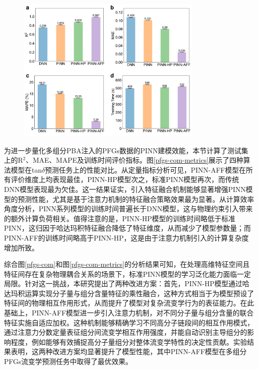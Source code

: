 \begin{figure}[htbp]
  \centering
  \includegraphics[width=0.8\textwidth]{Fig/pfgs-com-metrics.pdf}
\end{figure}
为进一步量化多组分PBA注入的PFGs数据的PINN建模效能，本节计算了测试集上的R$^2$、MAE、MAPE及训练时间评价指标。图\ref{pfgs-com-metrics}展示了四种算法模型在tan$\delta$预测任务上的性能对比。从定量指标分析可见，PINN-AFF模型在所有评价维度上均表现最佳，PINN-HP模型次之，标准PINN模型再次，而传统DNN模型表现最为欠佳。这一结果证实，引入特征融合机制能够显著增强PINN模型的预测性能，尤其是基于注意力机制的特征融合策略效果最为显著。从计算效率角度分析，PINN系列模型的训练时间普遍长于DNN模型，这与物理约束引入带来的额外计算负荷相关。值得注意的是，PINN-HP模型的训练时间略低于标准PINN，这归因于哈达玛积特征融合降低了特征维度，从而减少了模型参数量；而PINN-AFF的训练时间略高于PINN-HP，这是由于注意力机制引入的计算复杂度增加所致。


综合图\ref{pfgs-com}和图\ref{pfgs-com-metrics}的分析结果可知，在处理高维特征空间且特征间存在复杂物理耦合关系的场景下，标准PINN模型的学习泛化能力面临一定局限。针对这一挑战，本研究提出了两种改进方案：首先，PINN-HP模型通过哈达玛积运算实现分子量与组分含量特征的乘性融合，这种方式相当于为模型预设了特征间的物理相互作用形式，从而提升了模型对复杂流变学行为的表征能力。在此基础上，PINN-AFF模型进一步引入注意力机制，对不同分子量与组分含量的联合特征实施自适应加权。这种机制能够精确学习不同高分子链段间的相互作用模式，通过注意力分数定量表征组分间流变学相互作用强度，并能自动识别主导组分的影响程度，例如能够有效捕捉高分子量组分对整体流变学特性的决定性贡献。实验结果表明，这两种改进方案均显著提升了模型性能，其中PINN-AFF模型在多组分PFGs流变学预测任务中取得了最优效果。

